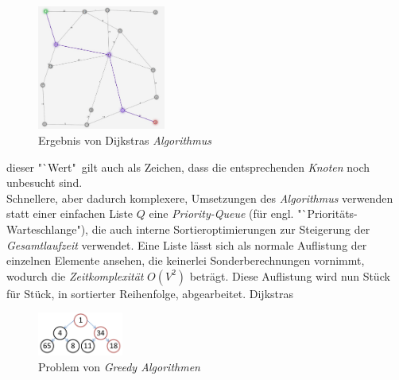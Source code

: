 \documentclass[12pt]{article}
\begin{document}
\begin{figure}
\vspace{-20pt}
\begin{center}
\includegraphics[width=0.375\textwidth]{res/dijk.png}
\end{center}
\vspace{-30pt}
\centering
\caption{Ergebnis von Dijkstras \textit{Algorithmus}}
\label{fig:dijk}
\end{figure}

\noindent dieser "`Wert"\ gilt auch als Zeichen, dass die entsprechenden \textit{Knoten} noch unbesucht sind.
\\
Schnellere, aber dadurch komplexere, Umsetzungen des \textit{Algorithmus} verwenden statt einer einfachen Liste $Q$ eine \textit{Priority-Queue} (für engl. "`Prioritäts-Warteschlange"), die auch interne Sortieroptimierungen zur Steigerung der \textit{Gesamtlaufzeit} verwendet. Eine Liste lässt sich als normale Auflistung der einzelnen Elemente ansehen, die keinerlei Sonderberechnungen vornimmt, wodurch die \textit{Zeitkomplexität} $O(V^2)$ beträgt. Diese Auflistung wird nun Stück für Stück, in sortierter Reihenfolge, abgearbeitet. Dijkstras 
\begin{figure}
\vspace{-20pt}
\begin{center}
\includegraphics[width=0.25\textwidth]{res/greed.png}
\end{center}
\vspace{-30pt}
\centering
\caption{Problem von \textit{Greedy Algorithmen}}
\label{fig:greed}
\end{figure}
\end{document}
